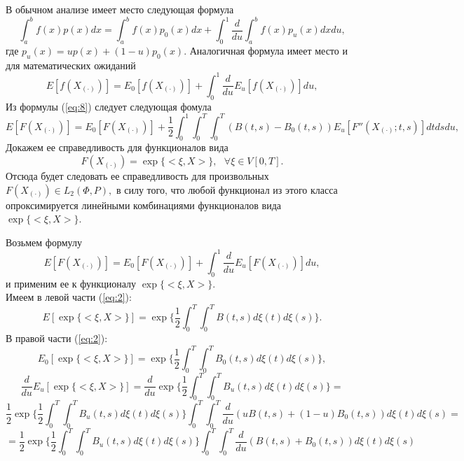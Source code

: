 \documentclass [12pt]{report}
\begin{document}
В обычном анализе имеет место следующая формула
\begin{equation}\label{eq:7}
\int_a^b{f(x)p(x)dx} = \int_a^b{f(x)p_0(x)dx} + \int_0^1{\frac{d}{du}}\int_a^b{f(x)p_u(x)dx du},
\end{equation}
где $p_u(x) = up(x) + (1 - u)p_0(x).$ Аналогичная формула имеет место и для математических ожиданий
\begin{equation}\label{eq:8}
E[f(X_{(\cdot)})] = E_0[f(X_{(\cdot)})] + \int_0^1{\frac{d}{du} E_u[f(X_{(\cdot)})] du},
\end{equation}
Из формулы (\ref{eq:8}) следует следующая фомула
\begin{equation}
E[F(X_{(\cdot)})] = E_0[F(X_{(\cdot)})] +
\frac{1}{2}\int_{0}^{1}\int_{0}^{T}\int_{0}^{T}(B(t,s)-B_0(t,s))
E_u[F''(X_{(\cdot)};t,s)]dtdsdu,
\label{eq:1}
\end{equation}
Докажем ее справедливость для функционалов вида
$$
F(X_{(\cdot)}) = \exp\{<\xi,X>\},~~~ \forall \xi \in V[0, T].
$$
Отсюда будет следовать ее справедливость для произвольных
$ F(X_{(\cdot)}) \in L_2(\Phi, P),$ в силу того, что любой функционал
из этого класса опроксимируется линейными комбинациями функционалов вида
$\exp\{<\xi,X>\}.$

Возьмем формулу
\begin{equation}
E[F(X_{(\cdot)})] = E_0[F(X_{(\cdot)})] + \int_{0}^{1}\frac{d}{du}
E_u[F(X_{(\cdot)})]du,
\label{eq:2}
\end{equation}
и применим ее к функционалу $\exp\{<\xi,X>\}.$\\
Имеем в левой части (\ref{eq:2}):
$$
E[\exp\{<\xi,X>\}] = \exp\{
\frac{1}{2}\int_{0}^{T}\int_{0}^{T}B(t,s)d\xi(t)d\xi(s)
\}.
$$
В правой части (\ref{eq:2}):
$$
E_0[\exp\{<\xi,X>\}] = \exp\{
\frac{1}{2}\int_{0}^{T}\int_{0}^{T}B_0(t,s)d\xi(t)d\xi(s)\},
$$
$$
\frac{d}{du}E_u[\exp\{<\xi,X>\}]=\frac{d}{du}\exp\{
\frac{1}{2}\int_{0}^{T}\int_{0}^{T}B_u(t,s)d\xi(t)d\xi(s)\} =
$$
$$
\frac{1}{2}\exp\{
\frac{1}{2}\int_{0}^{T}\int_{0}^{T}B_u(t,s)d\xi(t)d\xi(s)\}
\int_{0}^{T}\int_{0}^{T}\frac{d}{du}
(uB(t,s) + (1-u)B_0(t,s)) d\xi(t)d\xi(s) =
$$
$$
= \frac{1}{2}\exp\{
\frac{1}{2}\int_{0}^{T}\int_{0}^{T}B_u(t,s)d\xi(t)d\xi(s)\}
\int_{0}^{T}\int_{0}^{T}\frac{d}{du}(B(t,s)+B_0(t,s))d\xi(t)d\xi(s)
$$
\end{document}
